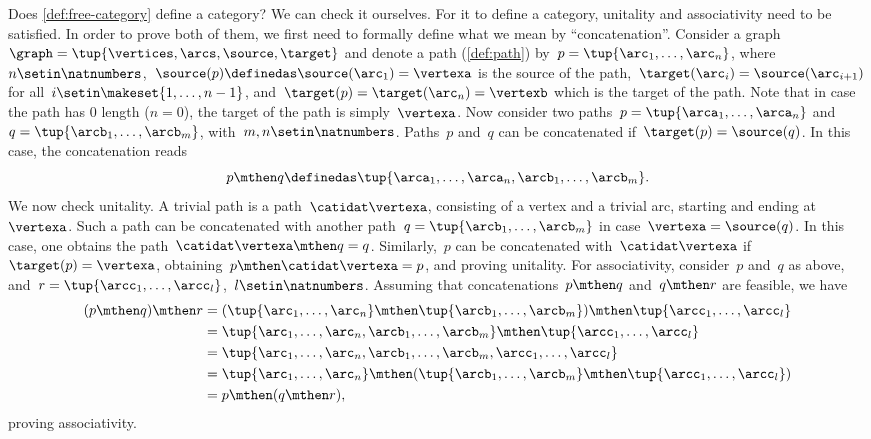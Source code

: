Does \cref{def:free-category} define a category?
We can check it ourselves.
For it to define a category, unitality and associativity need to be satisfied.
In order to prove both of them, we first need to formally define what we mean by ``concatenation''.
Consider a graph~$\graph=\tup{\vertices,\arcs,\source,\target}$ and denote a path (\cref{def:path}) by~$p=\tup{\arc_1,\ldots, \arc_n}$, where~$n\setin \natnumbers$,~$\source(p)\definedas\source(\arc_1)=\vertexa$ is the source of the path,~$\target(\arc_i)=\source(\arc_{i+1})$ for all~$i\setin \makeset{1,\ldots,n-1}$, and~$\target(p)=\target(\arc_n)=\vertexb$ which is the target of the path.
Note that in case the path has 0 length ($n=0$), the target of the path is simply~$\vertexa$.
Now consider two paths~$p=\tup{\arca_1,\ldots,\arca_n}$ and~$q=\tup{\arcb_1,\ldots,\arcb_m}$, with~$m,n\setin \natnumbers$.
Paths~$p$ and~$q$ can be concatenated if~$\target(p)=\source(q)$.
In this case, the concatenation reads
%
\begin{equation}
    p\mthen q\definedas \tup{\arca_1,\ldots, \arca_n,\arcb_1,\ldots,\arcb_m}.
\end{equation}
%
We now check unitality.
A trivial path is a path~$\catidat\vertexa$, consisting of a vertex and a trivial arc, starting and ending at~$\vertexa$.
Such a path can be concatenated with another path~$q=\tup{\arcb_1,\ldots,\arcb_m}$ in case~$\vertexa=\source(q)$.
In this case, one obtains the path~$\catidat\vertexa \mthen q=q$.
Similarly,~$p$ can be concatenated with~$\catidat\vertexa$ if~$\target(p)=\vertexa$, obtaining~$p\mthen \catidat\vertexa=p$, and proving unitality.
For associativity, consider~$p$ and~$q$ as above, and~$r=\tup{\arcc_1,\ldots,\arcc_l}$,~$l\setin \natnumbers$.
Assuming that concatenations~$p\mthen q$ and~$q\mthen r$ are feasible, we have
\begin{equation}
    \begin{aligned}
        (p\mthen q)
        \mthen r & =(\tup{\arc_1,\ldots, \arc_n}\mthen \tup{\arcb_1,\ldots,\arcb_m})\mthen \tup{\arcc_1,\ldots,\arcc_l} \\
                 & =\tup{\arc_1,\ldots, \arc_n,\arcb_1,\ldots,\arcb_m}\mthen \tup{\arcc_1,\ldots,\arcc_l} \\
                 & = \tup{\arc_1,\ldots, \arc_n,\arcb_1,\ldots,\arcb_m, \arcc_1,\ldots,\arcc_l} \\
                 & =\tup{\arc_1,\ldots, \arc_n} \mthen (\tup{\arcb_1,\ldots,\arcb_m}\mthen \tup{\arcc_1,\ldots,\arcc_l}) \\
                 & =p\mthen (q\mthen r),
    \end{aligned}
\end{equation}
proving associativity.


